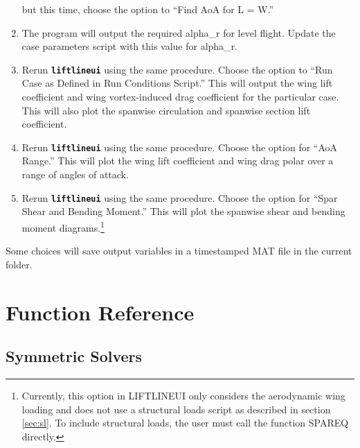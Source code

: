\documentclass{article}
\begin{document}
\begin{enumerate}
    but this time, choose the option to ``Find AoA for L = W.''
  \item The program will output the required alpha\_r for level
    flight.  Update the case parameters script with this value for
    alpha\_r.
  \item Rerun \texttt{\textbf{liftlineui}} using the same procedure.
    Choose the option to ``Run Case as Defined in Run Conditions
    Script.''  This will output the wing lift coefficient and wing
    vortex-induced drag coefficient for the particular case.  This
    will also plot the spanwise circulation and spanwise section lift
    coefficient.
  \item Rerun \texttt{\textbf{liftlineui}} using the same procedure.
    Choose the option for ``AoA Range.''  This will plot the wing lift
    coefficient and wing drag polar over a range of angles of attack.
  \item Rerun \texttt{\textbf{liftlineui}} using the same procedure.
    Choose the option for ``Spar Shear and Bending Moment.''  This
    will plot the spanwise shear and bending moment
    diagrams.\footnote{Currently, this option in LIFTLINEUI only
      considers the aerodynamic wing loading and does not use a
      structural loads script as described in section \ref{sec:sl}.
      To include structural loads, the user must call the function
      SPAREQ directly.}
\end{enumerate}
Some choices will save output variables in a timestamped MAT file in the
current folder.
\section{Function Reference}
\subsection{Symmetric Solvers}
\end{document}
